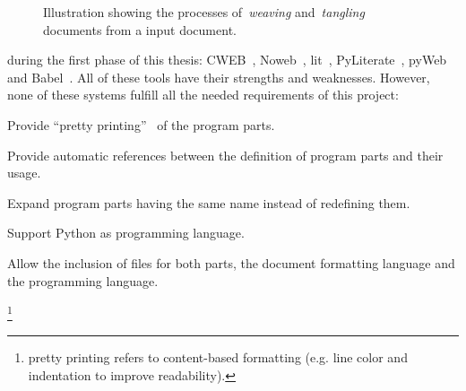 \documentclass[%
    a4paper,    %
    justified,  %
    nobib,      %
    openany     %
]{tufte-book}
\begin{document}
\begin{figure}
  \label{fig:weave-and-tangle}
  \caption{Illustration showing the processes of~\emph{weaving}
    and~\emph{tangling} documents from a input document.~\cite{knuth-lp-1984}}
\end{figure}

 during the
first phase of this thesis:
CWEB~,
Noweb~,
lit~,
PyLiterate~,
pyWeb~ and
Babel~. All of these
tools have their strengths and weaknesses.
However, none of these systems fulfill all the needed requirements of this
project:
\begin{enumerate*}
  \item Provide \enquote{pretty printing}~\protect\footnotemark[1]{} of the program parts.
  \item Provide automatic references between the definition of program parts and
    their usage.
  \item Expand program parts having the same name instead of redefining them.
  \item Support Python as programming language.
  \item Allow the inclusion of files for both parts, the document formatting
    language and the programming language.
\end{enumerate*}
\footnote{pretty printing refers to content-based formatting (e.g. line color
  and indentation to improve readability).}
\end{document}
